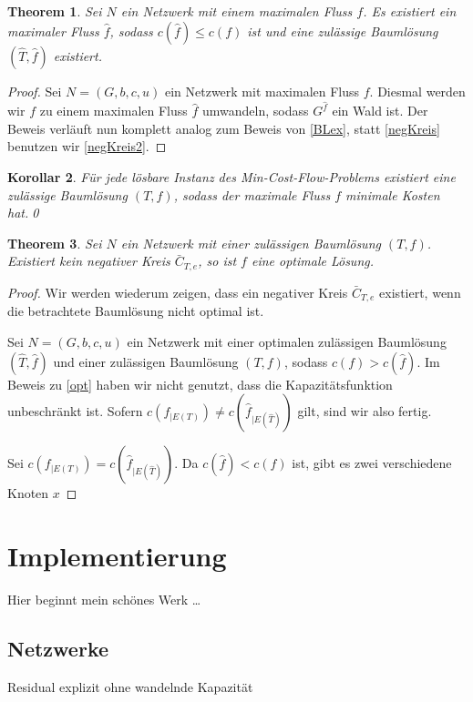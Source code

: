 \documentclass[a4paper,twoside,ngerman]{report}
\theoremstyle{plain}
\newtheorem{thm}{Theorem}
\newtheorem{kor}[thm]{Korollar}
\theoremstyle{definition}
\begin{document}
\begin{thm}\label{BLex2}Sei $N$ ein Netzwerk mit einem maximalen Fluss $f$. Es existiert ein maximaler Fluss $\hat{f}$, sodass $c(\hat{f})\leq c(f)$ ist und eine zulässige Baumlösung $(\hat{T},\hat{f})$ existiert.\end{thm}
\begin{proof}Sei $N=(G,b,c,u)$ ein Netzwerk mit maximalen Fluss $f$. Diesmal werden wir $f$ zu einem maximalen Fluss $\hat{f}$ umwandeln, sodass $G^{\hat{f}}$ ein Wald ist. Der Beweis verläuft nun komplett analog zum Beweis von \cref{BLex}, statt \cref{negKreis} benutzen wir \cref{negKreis2}.\end{proof}

\begin{kor}Für jede lösbare Instanz des Min-Cost-Flow-Problems existiert eine zulässige Baumlösung $(T,f)$, sodass der maximale Fluss $f$ minimale Kosten hat.\qed\end{kor}

\begin{thm}\label{opt2}Sei $N$ ein Netzwerk mit einer zulässigen Baumlösung $(T,f)$. Existiert kein negativer Kreis $\bar{C}_{T,e}$, so ist $f$ eine optimale Lösung.\end{thm}
\begin{proof}Wir werden wiederum zeigen, dass ein negativer Kreis $\bar{C}_{T,e}$ existiert, wenn die betrachtete Baumlösung nicht optimal ist.

Sei $N=(G,b,c,u)$ ein Netzwerk mit einer optimalen zulässigen Baumlösung $(\hat{T},\hat{f})$ und einer zulässigen Baumlösung $(T,f)$, sodass $c(f)>c(\hat{f})$. Im Beweis zu \cref{opt} haben wir nicht genutzt, dass die Kapazitätsfunktion unbeschränkt ist. Sofern $c(f_{|E(T)})\neq c(\hat{f}_{|E(\hat{T})})$ gilt, sind wir also fertig.

Sei $c(f_{|E(T)})=c(\hat{f}_{|E(\hat{T})})$. Da $c(\hat{f})<c(f)$ ist, gibt es zwei verschiedene Knoten $x$
\end{proof}


\newpage
\chapter{Implementierung} \label{ch:prog}
Hier beginnt mein schönes Werk \ldots

\section{Netzwerke}
Residual explizit ohne wandelnde Kapazität
\end{document}
